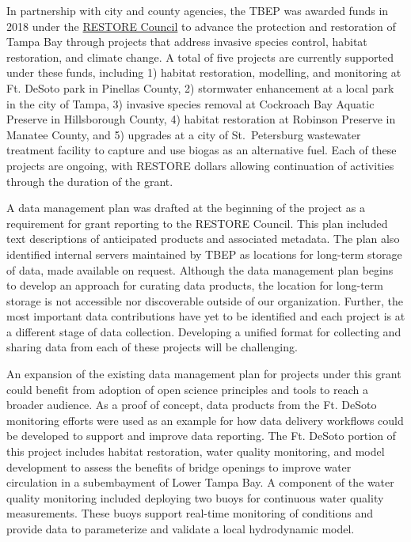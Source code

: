 \documentclass[
]{book}
\begin{document}
In partnership with city and county agencies, the TBEP was awarded funds in 2018 under the \href{https://www.restorethegulf.gov/}{RESTORE Council} to advance the protection and restoration of Tampa Bay through projects that address invasive species control, habitat restoration, and climate change. A total of five projects are currently supported under these funds, including 1) habitat restoration, modelling, and monitoring at Ft. DeSoto park in Pinellas County, 2) stormwater enhancement at a local park in the city of Tampa, 3) invasive species removal at Cockroach Bay Aquatic Preserve in Hillsborough County, 4) habitat restoration at Robinson Preserve in Manatee County, and 5) upgrades at a city of St.~Petersburg wastewater treatment facility to capture and use biogas as an alternative fuel. Each of these projects are ongoing, with RESTORE dollars allowing continuation of activities through the duration of the grant.

A data management plan was drafted at the beginning of the project as a requirement for grant reporting to the RESTORE Council. This plan included text descriptions of anticipated products and associated metadata. The plan also identified internal servers maintained by TBEP as locations for long-term storage of data, made available on request. Although the data management plan begins to develop an approach for curating data products, the location for long-term storage is not accessible nor discoverable outside of our organization. Further, the most important data contributions have yet to be identified and each project is at a different stage of data collection. Developing a unified format for collecting and sharing data from each of these projects will be challenging.

An expansion of the existing data management plan for projects under this grant could benefit from adoption of open science principles and tools to reach a broader audience. As a proof of concept, data products from the Ft. DeSoto monitoring efforts were used as an example for how data delivery workflows could be developed to support and improve data reporting. The Ft. DeSoto portion of this project includes habitat restoration, water quality monitoring, and model development to assess the benefits of bridge openings to improve water circulation in a subembayment of Lower Tampa Bay. A component of the water quality monitoring included deploying two buoys for continuous water quality measurements. These buoys support real-time monitoring of conditions and provide data to parameterize and validate a local hydrodynamic model.
\end{document}

